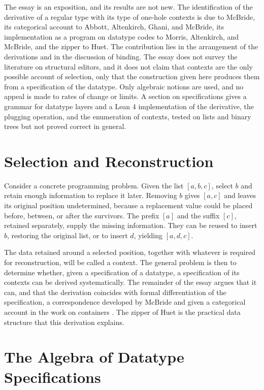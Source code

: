 \documentclass[11pt]{article}
\begin{document}
The essay is an exposition, and its results are not new. The identification of the derivative of a regular type with its type of one-hole contexts is due to McBride, its categorical account to Abbott, Altenkirch, Ghani, and McBride, its implementation as a program on datatype codes to Morris, Altenkirch, and McBride, and the zipper to Huet. The contribution lies in the arrangement of the derivations and in the discussion of binding. The essay does not survey the literature on structural editors, and it does not claim that contexts are the only possible account of selection, only that the construction given here produces them from a specification of the datatype. Only algebraic notions are used, and no appeal is made to rates of change or limits. A section on specifications gives a grammar for datatype layers and a Lean 4 implementation of the derivative, the plugging operation, and the enumeration of contexts, tested on lists and binary trees but not proved correct in general.

\section{Selection and Reconstruction}

Consider a concrete programming problem. Given the list $[a,b,c]$, select $b$ and retain enough information to replace it later. Removing $b$ gives $[a,c]$ and leaves its original position undetermined, because a replacement value could be placed before, between, or after the survivors. The prefix $[a]$ and the suffix $[c]$, retained separately, supply the missing information. They can be reused to insert $b$, restoring the original list, or to insert $d$, yielding $[a,d,c]$.

The data retained around a selected position, together with whatever is required for reconstruction, will be called a context. The general problem is then to determine whether, given a specification of a datatype, a specification of its contexts can be derived systematically. The remainder of the essay argues that it can, and that the derivation coincides with formal differentiation of the specification, a correspondence developed by McBride \cite{mcbride2001} and given a categorical account in the work on containers \cite{aag2005,derivcont2003,partial2005}. The zipper of Huet \cite{huet1997} is the practical data structure that this derivation explains.

\section{The Algebra of Datatype Specifications}
\end{document}
